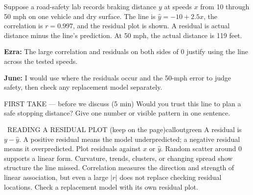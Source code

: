 \documentclass[11pt]{article}
\begin{document}


Suppose a road-safety lab records braking distance $y$ at speeds $x$ from 10 through 50 mph on one vehicle and dry surface. The line is $\hat y=-10+2.5x$, the correlation is $r=0.997$, and the residual plot is shown. A residual is actual distance minus the line's prediction. At 50 mph, the actual distance is 119 feet.\par\smallskip \textbf{Ezra:} The large correlation and residuals on both sides of 0 justify using the line across the tested speeds.\par \textbf{June:} I would use where the residuals occur and the 50-mph error to judge safety, then check any replacement model separately.\par
\begin{center}
\end{center}
\begin{firsttakebox}{FIRST TAKE --- before we discuss (5 min)}
Would you trust this line to plan a safe stopping distance? Give one number or visible pattern in one sentence.
\workspace{0.85in}
\end{firsttakebox}

\begin{callout}{\IconBook\ READING A RESIDUAL PLOT (keep on the page)}{calloutgreen}
A residual is $y-\hat y$. A positive residual means the model underpredicted;
a negative residual means it overpredicted. Plot residuals against $x$ or $\hat y$.
Random scatter around 0 supports a linear form. Curvature, trends, clusters, or
changing spread show structure the line missed. Correlation measures the direction
and strength of linear association, but even a large $|r|$ does not replace checking
residual locations. Check a replacement model with its own residual plot.
\end{callout}
\end{document}
